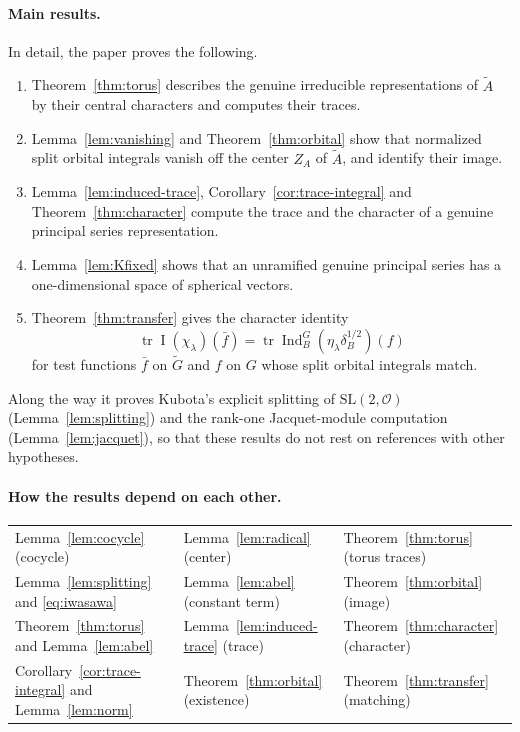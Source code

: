 \documentclass[12pt,letterpaper]{article}
\numberwithin{equation}{section}
\theoremstyle{plain}
\theoremstyle{definition}
\theoremstyle{remark}
\newcommand{\Gt}{\widetilde G}
\newcommand{\At}{\widetilde A}
\newcommand{\Of}{\mathcal O}
\newcommand{\ZA}{Z_A}
\DeclareMathOperator{\PI}{I}
\DeclareMathOperator{\Ind}{Ind}
\DeclareMathOperator{\tr}{tr}
\newcommand{\SL}{\mathrm{SL}}
\begin{document}
\paragraph{Main results.} In detail, the paper proves the following.
\begin{enumerate}[label=(\roman*),leftmargin=*]
\item Theorem~\ref{thm:torus} describes the genuine irreducible
  representations of $\At$ by their central characters and computes
  their traces.
\item Lemma~\ref{lem:vanishing} and Theorem~\ref{thm:orbital} show that
  normalized split orbital integrals vanish off the center $\ZA$ of
  $\At$, and identify their image.
\item Lemma~\ref{lem:induced-trace}, Corollary~\ref{cor:trace-integral}
  and Theorem~\ref{thm:character} compute the trace and the character
  of a genuine principal series representation.
\item Lemma~\ref{lem:Kfixed} shows that an unramified genuine principal
  series has a one-dimensional space of spherical vectors.
\item Theorem~\ref{thm:transfer} gives the character identity
  \[
  \tr\PI(\chi_\lambda)(\bar f)=
  \tr\Ind_B^G(\eta_\lambda\delta_B^{1/2})(f)
  \]
  for test functions $\bar f$ on $\Gt$ and $f$ on $G$ whose split
  orbital integrals match.
\end{enumerate}
Along the way it proves Kubota's explicit splitting of $\SL(2,\Of)$
(Lemma~\ref{lem:splitting}) and the rank-one Jacquet-module computation
(Lemma~\ref{lem:jacquet}), so that these results do not rest on
references with other hypotheses.

\paragraph{How the results depend on each other.}
\begin{center}
\small
\begin{tabular}{@{}l@{\ $\longrightarrow$\ }l@{\ $\longrightarrow$\ }l@{}}
Lemma~\ref{lem:cocycle} (cocycle) & Lemma~\ref{lem:radical} (center)
 & Theorem~\ref{thm:torus} (torus traces)\\
Lemma~\ref{lem:splitting} and \eqref{eq:iwasawa} & Lemma~\ref{lem:abel}
 (constant term) & Theorem~\ref{thm:orbital} (image)\\
Theorem~\ref{thm:torus} and Lemma~\ref{lem:abel} &
 Lemma~\ref{lem:induced-trace} (trace) &
 Theorem~\ref{thm:character} (character)\\
Corollary~\ref{cor:trace-integral} and Lemma~\ref{lem:norm} &
 Theorem~\ref{thm:orbital} (existence) &
 Theorem~\ref{thm:transfer} (matching)
\end{tabular}
\end{center}
\end{document}
